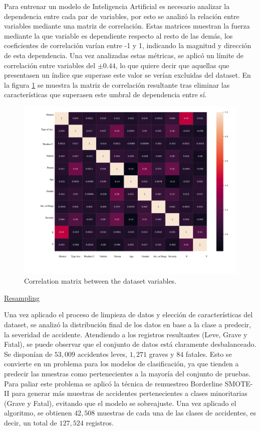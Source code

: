 \documentclass{uathesis-es}
\begin{document}
{%

Para entrenar un modelo de Inteligencia Artificial es necesario analizar la dependencia entre cada par de variables, por esto se analizó la relación entre variables mediante una matriz de correlación. Estas matrices muestran la fuerza mediante la que variable es dependiente respecto al resto de las demás, los coeficientes de correlación varían entre -1 y 1, indicando la magnitud y dirección de esta dependencia. Una vez analizadas estas métricas, se aplicó un límite de correlación entre variables del $\pm 0.44$, lo que quiere decir que aquellas que presentasen un índice que superase este valor se verían excluidas del dataset. En la figura \ref{CorrelationMatrix} se muestra la matriz de correlación resultante tras eliminar las características que superasen este umbral de dependencia entre sí.


 \begin{figure}[H]
	\centering
	\includegraphics[width=12cm]{Figures/1stPaper/CorrelationMatrix.png}
	\caption{Correlation matrix between the dataset variables.}
	\label{CorrelationMatrix}
\end{figure}



\underline{Resampling}

Una vez aplicado el proceso de limpieza de datos y elección de características del dataset, se analizó la distribución final de los datos en base a la clase a predecir, la severidad de accidente. Atendiendo a los registros resultantes (Leve, Grave y Fatal), se puede observar que el conjunto de datos está claramente desbalanceado. Se disponían de $53,009$ accidentes leves, $1,271$ graves y $84$ fatales. Esto se convierte en un problema para los modelos de clasificación, ya que tienden a predecir las muestras como pertenecientes a la mayoría del conjunto de pruebas. Para paliar este problema se aplicó la técnica de remuestreo Borderline SMOTE-II para generar más muestras de accidentes pertenecientes a clases minoritarias (Grave y Fatal), evitando que el modelo se sobreajuste. Una vez aplicado el algoritmo, se obtienen $42,508$ muestras de cada una de las clases de accidentes, es decir, un total de $127,524$ registros.


}
\end{document}
